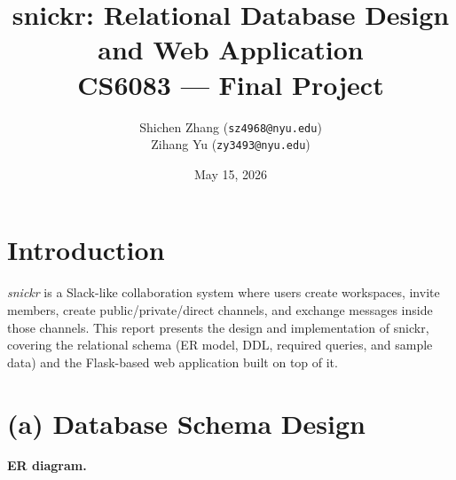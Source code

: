 \documentclass[11pt,letterpaper]{article}
\title{\textbf{snickr: Relational Database Design and Web Application}\\[0.2em]
       \large CS6083 --- Final Project}
\author{Shichen Zhang \quad (\texttt{sz4968@nyu.edu})\\
        Zihang Yu \quad (\texttt{zy3493@nyu.edu})}
\date{May 15, 2026}
\begin{document}
\maketitle
\thispagestyle{fancy}

\section*{Introduction}
\emph{snickr} is a Slack-like collaboration system where users create
workspaces, invite members, create public/private/direct channels, and exchange
messages inside those channels. This report presents the design and
implementation of snickr, covering the relational schema (ER model, DDL,
required queries, and sample data) and the Flask-based web application built
on top of it.

\section*{(a) Database Schema Design}

\noindent\textbf{ER diagram.}
\end{document}
